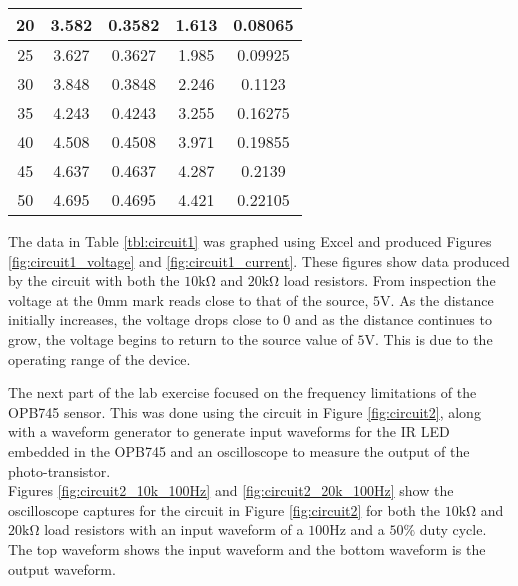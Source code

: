 \documentclass[CMPE]{KGCOEReport}
\begin{document}
\begin{longtable}[c]{|c|c|c|c|c|}
20            & 3.582          & 0.3582        & 1.613          & 0.08065       \\ \hline
25            & 3.627          & 0.3627        & 1.985          & 0.09925       \\ \hline
30            & 3.848          & 0.3848        & 2.246          & 0.1123        \\ \hline
35            & 4.243          & 0.4243        & 3.255          & 0.16275       \\ \hline
40            & 4.508          & 0.4508        & 3.971          & 0.19855       \\ \hline
45            & 4.637          & 0.4637        & 4.287          & 0.2139        \\ \hline
50            & 4.695          & 0.4695        & 4.421          & 0.22105       \\ \hline
\end{longtable}

The data in Table \ref{tbl:circuit1} was graphed using Excel and produced Figures \ref{fig:circuit1_voltage}
and \ref{fig:circuit1_current}. These figures show data produced by the circuit with both the $10\si{\kilo\ohm}$
and $20\si{\kilo\ohm}$ load resistors. From inspection the voltage at the $0\si{\milli\meter}$ mark reads close to that
of the source, $5\si\volt$. As the distance initially increases, the voltage drops close to 0 and as the distance continues
to grow, the voltage begins to return to the source value of $5\si\volt$. This is due to the operating range of the device. 


The next part of the lab exercise focused on the frequency limitations of the OPB745 sensor. This was done using the circuit in
Figure \ref{fig:circuit2}, along with a waveform generator to generate input waveforms for the IR LED embedded in the 
OPB745 and an oscilloscope to measure the output of the photo-transistor. \\

Figures \ref{fig:circuit2_10k_100Hz} and \ref{fig:circuit2_20k_100Hz} show the oscilloscope captures for
the circuit in Figure \ref{fig:circuit2} for both the $10\si{\kilo\ohm}$ and $20\si{\kilo\ohm}$ load resistors
with an input waveform of a $100\si\hertz$ and a $50\%$ duty cycle. The top waveform shows the input waveform and
the bottom waveform is the output waveform.
\end{document}
